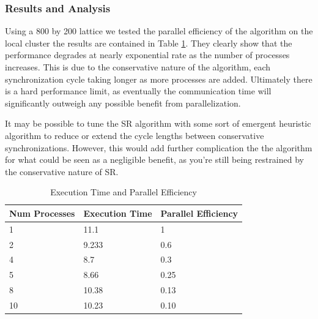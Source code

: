 \subsubsection{Results and Analysis}
Using a 800 by 200 lattice we tested the parallel efficiency of the algorithm on the local cluster the results are contained in Table \ref{parallelefficiency}.  They clearly show that the performance degrades at nearly exponential rate as the number of processes increases.  This is due to the conservative nature of the algorithm, each synchronization cycle taking longer as more processes are added.  Ultimately there is a hard performance limit, as eventually the communication time will significantly outweigh any possible benefit from parallelization.

It may be possible to tune the SR algorithm with some sort of emergent heuristic algorithm to reduce or extend the cycle lengths between conservative synchronizations.  However, this would add further complication the the algorithm for what could be seen as a negligible benefit, as you're still being restrained by the conservative nature of SR.

\begin{table}
\begin{tabular}{|l|l|l|}
\hline
Num Processes & Execution Time & Parallel Efficiency \\ \hline
1 & 11.1 & 1 \\ \hline
2 & 9.233 & 0.6 \\ \hline
4 & 8.7 & 0.3 \\ \hline
5 & 8.66 & 0.25 \\ \hline
8 & 10.38 & 0.13 \\ \hline
10 & 10.23 & 0.10 \\ \hline
\end{tabular}
\caption{Execution Time and Parallel Efficiency}
\label{parallelefficiency}
\end{table}

